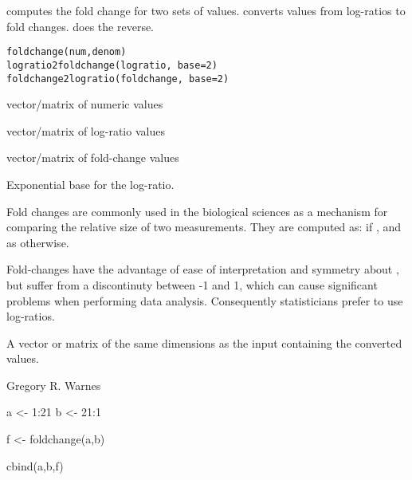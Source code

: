 \begin{Description}\relax
{} computes the fold change for two sets of values.
 converts values from log-ratios to fold
changes.   does the reverse.
\end{Description}
\begin{Usage}
\begin{verbatim}
foldchange(num,denom)
logratio2foldchange(logratio, base=2)
foldchange2logratio(foldchange, base=2)
\end{verbatim}
\end{Usage}
\begin{Arguments}
\begin{ldescription}
\item[\code{num,denom}] vector/matrix of numeric values
\item[\code{logratio}] vector/matrix of log-ratio values
\item[\code{foldchange}] vector/matrix of fold-change values
\item[\code{base}] Exponential base for the log-ratio.
\end{ldescription}
\end{Arguments}
\begin{Details}\relax
Fold changes are commonly used in the biological sciences as a
mechanism for comparing the relative size of two measurements.  They
are computed as:  if
, and as 
otherwise.

Fold-changes have the advantage of ease of interpretation and symmetry
about , but suffer from a discontinuty between -1 and
1, which can cause significant problems when performing data
analysis.  Consequently statisticians prefer to use log-ratios.
\end{Details}
\begin{Value}
A vector or matrix of the same dimensions as the input containing the
converted values.
\end{Value}
\begin{Author}\relax
Gregory R. Warnes 
\end{Author}
\begin{Examples}
\begin{ExampleCode}

  a <- 1:21
  b <- 21:1

  f <- foldchange(a,b)

  cbind(a,b,f)

\end{ExampleCode}
\end{Examples}

